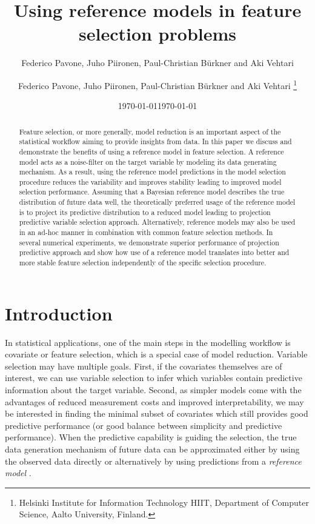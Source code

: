 \documentclass[american,]{article}
\title{Using reference models in feature selection problems 
	\vspace{.1in}}
\author{Federico Pavone, Juho Piironen, Paul-Christian B\"{u}rkner and Aki Vehtari}
\author{
    Federico Pavone, 
  Juho Piironen,
  Paul-Christian B\"{u}rkner
  and Aki Vehtari \footnote{Helsinki Institute for Information Technology HIIT,
  Department of Computer Science, Aalto University, Finland.}
  }
\date{\today}
\date{\today}
\theoremstyle{definition}
\begin{document}
\maketitle
\begin{abstract}
  Feature selection, or more generally, model reduction is an important aspect of the statistical workflow aiming to provide insights from data. In this paper we discuss and demonstrate the benefits of using a reference model in feature selection. A reference model acts as a noise-filter on the target variable by modeling its data generating mechanism. As a result, using the reference model predictions in the model selection procedure reduces the variability and improves stability leading to improved model selection performance. Assuming that a Bayesian reference model describes the true distribution of future data well, the theoretically preferred usage of the reference model is to project its predictive distribution to a reduced model leading to projection predictive variable selection approach. Alternatively, reference models may also be used in an ad-hoc manner in combination with common feature selection methods.  In several numerical experiments, we demonstrate superior performance of projection predictive approach and show how use of a reference model translates into better and more stable feature selection independently of the specific selection procedure. 
\end{abstract}

\hypertarget{introduction}{%
\section{Introduction}\label{introduction}}

In statistical applications, one of the main steps in the modelling
workflow is covariate or feature selection, which is a special case of
model reduction. Variable selection may have multiple goals.  First,
if the covariates themselves are of interest, we can use variable
selection to infer which variables contain predictive information
about the target variable.  Second, as simpler models come with the
advantages of reduced measurement costs and improved interpretability,
we may be interested in finding the minimal subset of covariates which
still provides good predictive performance (or good balance between
simplicity and predictive performance).  When the predictive
capability is guiding the selection, the true data generation
mechanism of future data can be approximated either by using the
observed data directly or alternatively by using predictions from a
\emph{reference model} \citep{vehtari2012survey}.
\end{document}
